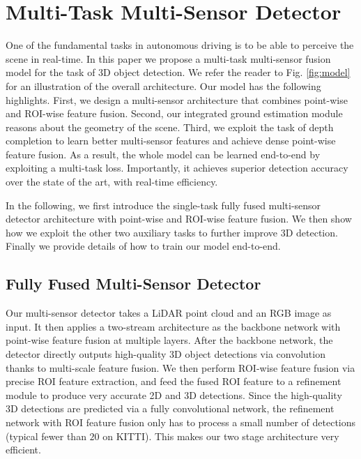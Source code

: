 \documentclass[10pt,twocolumn,letterpaper]{article}
\begin{document}
\section{Multi-Task Multi-Sensor Detector}
One of the fundamental tasks in autonomous driving is to be able to perceive the scene in real-time.  
In this paper we propose a multi-task multi-sensor fusion model for the task of 3D object detection. We refer the reader to Fig. \ref{fig:model} for an illustration of the overall architecture. Our model has the following highlights. 
First, we design a multi-sensor architecture that combines point-wise and ROI-wise feature fusion. 
Second, our integrated ground estimation module reasons about the geometry of the scene. 
Third, we exploit the task of depth completion to learn better multi-sensor features and achieve dense point-wise feature fusion. 
As a result, the whole model can be learned end-to-end by exploiting a multi-task loss. Importantly, it achieves superior detection accuracy over the state of the art, with real-time efficiency.

In the following, we first introduce the single-task fully fused multi-sensor detector architecture with point-wise and ROI-wise feature fusion. We then show how we exploit the other two auxiliary tasks to further improve 3D detection. Finally we provide details of how to train our model end-to-end.

\subsection{Fully Fused Multi-Sensor Detector}
Our  multi-sensor detector takes a LiDAR point cloud and an RGB image as input. It then applies a two-stream architecture as the backbone network with point-wise feature fusion  at multiple layers. After the backbone network, the detector directly outputs high-quality 3D object detections via convolution thanks to multi-scale feature fusion. We then perform ROI-wise feature fusion via precise ROI feature extraction, and feed the fused ROI feature to a refinement module to produce very accurate 2D and 3D detections. Since the high-quality 3D detections are predicted via a fully convolutional network,  the refinement network with ROI feature fusion only has to process a small number of detections (typical fewer than $20$ on KITTI). This makes our two stage architecture very efficient.
\end{document}
